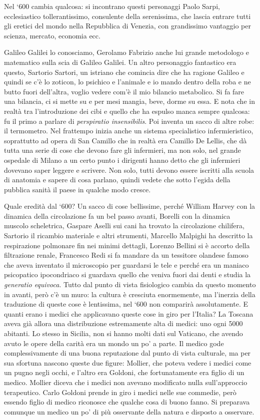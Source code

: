 Nel `600 cambia qualcosa: si incontrano questi personaggi Paolo Sarpi,
ecclesiastico tollerantissimo, consulente della serenissima, che lascia
entrare tutti gli eretici del mondo nella Repubblica di Venezia, con
grandissimo vantaggio per scienza, mercato, economia ecc.

Galileo Galilei lo conosciamo, Gerolamo Fabrizio anche lui grande
metodologo e matematico sulla scia di Galileo Galilei. Un altro
personaggio fantastico era questo, Sartorio Sartori, un istriano che
comincia dire che ha ragione Galileo e quindi se c'è lo zoticon, lo
psichico e l'animale e io mando dentro della roba e ne butto fuori
dell'altra, voglio vedere com'è il mio bilancio metabolico. Si fa fare
una bilancia, ci si mette su e per mesi mangia, beve, dorme su essa. E
nota che in realtà tra l'introduzione dei cibi e quello che ha espulso
manca sempre qualcosa: fu il primo a parlare di \emph{perspiratio
insensibilis}. Poi inventa un sacco di altre robe: il termometro. Nel
frattempo inizia anche un sistema specialistico infermieristico,
soprattutto ad opera di San Camillo che in realtà era Camillo De Lellis,
che dà tutta una serie di cose che devono fare gli infermieri, ma non
solo, nel grande ospedale di Milano a un certo punto i dirigenti hanno
detto che gli infermieri dovevano saper leggere e scrivere. Non solo,
tutti devono essere iscritti alla scuola di anatomia e sapere di cosa
parlano, quindi vedete che sotto l'egida della pubblica sanità il paese
in qualche modo cresce.

Quale eredità dal `600? Un sacco di cose bellissime, perché William
Harvey con la dinamica della circolazione fa un bel passo avanti,
Borelli con la dinamica muscolo scheletrica, Gaspare Aselli sui cani ha
trovato la circolazione chilifera, Sartorio il ricambio materiale e
altri strumenti, Marcello Malpighi ha descritto la respirazione
polmonare fin nei minimi dettagli, Lorenzo Bellini si è accorto della
filtrazione renale, Francesco Redi si fa mandare da un tessitore
olandese famoso che aveva inventato il microscopio per guardarsi le tele
e perché era un maniaco psicopatico ipocondriaco si guardava quello che
veniva fuori dai denti e studia la \emph{generatio equivoca}. Tutto dal
punto di vista fisiologico cambia da questo momento in avanti, però c'è
un muro: la cultura è cresciuta enormemente, ma l'inerzia della
traduzione di queste cose è lentissima, nel `600 non comparirà
assolutamente. E quanti erano i medici che applicavano queste cose in
giro per l'Italia? La Toscana aveva già allora una distribuzione
estremamente alta di medici: uno ogni 5000 abitanti. Lo stesso in
Sicilia, non si hanno molti dati sul Vaticano, che avendo avuto le opere
della carità era un mondo un po' a parte. Il medico gode
complessivamente di una buona reputazione dal punto di vista culturale,
ma per sua sfortuna nascono queste due figure: Mollier, che poteva
vedere i medici come un pugno negli occhi, e l'altro era Goldoni, che
fortunatamente era figlio di un medico. Mollier diceva che i medici non
avevano modificato nulla sull'approccio terapeutico. Carlo Goldoni
prende in giro i medici nelle sue commedie, però essendo figlio di
medico riconosce che qualche cosa di buono fanno. Si preparava comunque
un medico un po' di più osservante della natura e disposto a osservare.

